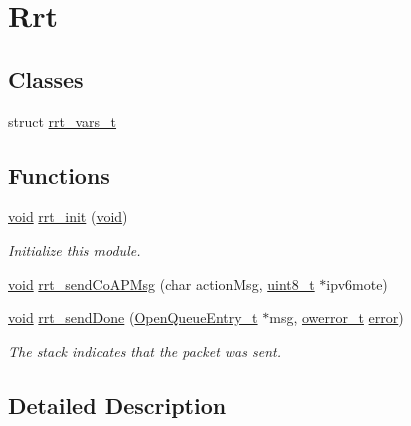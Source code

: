 \hypertarget{group__rrt}{}\section{Rrt}
\label{group__rrt}
\subsection*{Classes}
\begin{DoxyCompactItemize}
\item 
struct \hyperlink{structrrt__vars__t}{rrt\+\_\+vars\+\_\+t}
\end{DoxyCompactItemize}
\subsection*{Functions}
\begin{DoxyCompactItemize}
\item 
\hyperlink{usb__devapi_8h_afabf60e7f57651d6d595a02c75f07cd0}{void} \hyperlink{group__rrt_ga4175f20cafc20669a11649e60e46455e}{rrt\+\_\+init} (\hyperlink{usb__devapi_8h_afabf60e7f57651d6d595a02c75f07cd0}{void})
\begin{DoxyCompactList}\small\item\em Initialize this module. \end{DoxyCompactList}\item 
\hyperlink{usb__devapi_8h_afabf60e7f57651d6d595a02c75f07cd0}{void} \hyperlink{group__rrt_gaa2f9c775926eb27d9fabe449828dabd2}{rrt\+\_\+send\+Co\+A\+P\+Msg} (char action\+Msg, \hyperlink{_p_e___types_8h_aba7bc1797add20fe3efdf37ced1182c5}{uint8\+\_\+t} $\ast$ipv6mote)
\item 
\hyperlink{usb__devapi_8h_afabf60e7f57651d6d595a02c75f07cd0}{void} \hyperlink{group__rrt_ga5b34e5de121363d7b8c5d58b4ffe4aad}{rrt\+\_\+send\+Done} (\hyperlink{struct_open_queue_entry__t}{Open\+Queue\+Entry\+\_\+t} $\ast$msg, \hyperlink{opendefs_8h_af20b7c3ed9d2ba19e56a309ad9314803}{owerror\+\_\+t} \hyperlink{disk_8c_ad018a3100b2dabad325a0800152db297}{error})
\begin{DoxyCompactList}\small\item\em The stack indicates that the packet was sent. \end{DoxyCompactList}\end{DoxyCompactItemize}


\subsection{Detailed Description}


